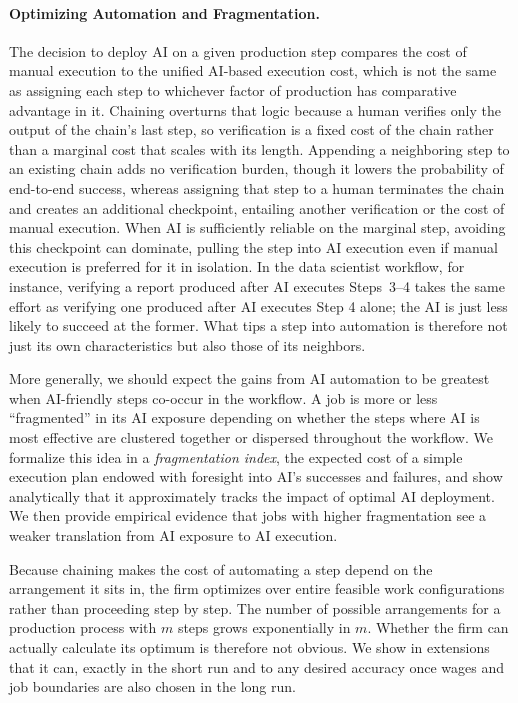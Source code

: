 \paragraph{Optimizing Automation and Fragmentation.}
The decision to deploy AI on a given production step compares the cost of manual execution to the unified AI-based execution cost, which is not the same as assigning each step to whichever factor of production has comparative advantage in it.
Chaining overturns that logic because a human verifies only the output of the chain's last step, so verification is a fixed cost of the chain rather than a marginal cost that scales with its length.
Appending a neighboring step to an existing chain adds no verification burden, though it lowers the probability of end-to-end success, whereas assigning that step to a human terminates the chain and creates an additional checkpoint, entailing another verification or the cost of manual execution.
When AI is sufficiently reliable on the marginal step, avoiding this checkpoint can dominate, pulling the step into AI execution even if manual execution is preferred for it in isolation.
In the data scientist workflow, for instance, verifying a report produced after AI executes Steps~3--4 takes the same effort as verifying one produced after AI executes Step 4 alone; the AI is just less likely to succeed at the former.
What tips a step into automation is therefore not just its own characteristics but also those of its neighbors.

More generally, we should expect the gains from AI automation to be greatest when AI-friendly steps co-occur in the workflow.
A job is more or less ``fragmented'' in its AI exposure depending on whether the steps where AI is most effective are clustered together or dispersed throughout the workflow.
We formalize this idea in a \emph{fragmentation index}, the expected cost of a simple execution plan endowed with foresight into AI's successes and failures, and show analytically that it approximately tracks the impact of optimal AI deployment.
We then provide empirical evidence that jobs with higher fragmentation see a weaker translation from AI exposure to AI execution.

Because chaining makes the cost of automating a step depend on the arrangement it sits in, the firm optimizes over entire feasible work configurations rather than proceeding step by step.
The number of possible arrangements for a production process with $m$ steps grows exponentially in $m$.
Whether the firm can actually calculate its optimum is therefore not obvious. 
We show in extensions that it can, exactly in the short run and to any desired accuracy once wages and job boundaries are also chosen in the long run.


